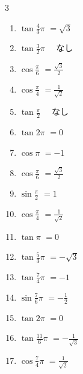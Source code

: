 \begin{multicols}{3}
\begin{enumerate}
  \item $\displaystyle \tan{\frac{4}{3}\pi}$
        $\displaystyle =\sqrt{3}$

  \item $\displaystyle \tan{\frac{3}{2}\pi}$
        $\displaystyle \quad なし$

  \item $\displaystyle \cos{\frac{\pi}{6}}$
        $\displaystyle =\frac{\sqrt{3}}{2}$

  \item $\displaystyle \cos{\frac{\pi}{4}}$
        $\displaystyle =\frac{1}{\sqrt{2}}$

\columnbreak %

  \item $\displaystyle \tan{\frac{\pi}{2}}$
        $\displaystyle \quad なし$

  \item $\displaystyle \tan{2\pi}$
        $\displaystyle =0$

  \item $\displaystyle \cos{\pi}$
        $\displaystyle =-1$

  \item $\displaystyle \cos{\frac{\pi}{6}}$
        $\displaystyle =\frac{\sqrt{3}}{2}$

  \item $\displaystyle \sin{\frac{\pi}{2}}$
        $\displaystyle =1$

  \item $\displaystyle \cos{\frac{\pi}{4}}$
        $\displaystyle =\frac{1}{\sqrt{2}}$

  \item $\displaystyle \tan{\pi}$
        $\displaystyle =0$

  \item $\displaystyle \tan{\frac{5}{3}\pi}$
        $\displaystyle =-\sqrt{3}$

  \item $\displaystyle \tan{\frac{7}{4}\pi}$
        $\displaystyle =-1$

  \item $\displaystyle \sin{\frac{7}{6}\pi}$
        $\displaystyle =-\frac{1}{2}$

  \item $\displaystyle \tan{2\pi}$
        $\displaystyle =0$

  \item $\displaystyle \tan{\frac{11}{6}\pi}$
        $\displaystyle =-\frac{1}{\sqrt{3}}$

  \item $\displaystyle \cos{\frac{7}{4}\pi}$
        $\displaystyle =\frac{1}{\sqrt{2}}$


\end{enumerate}
\end{multicols}
